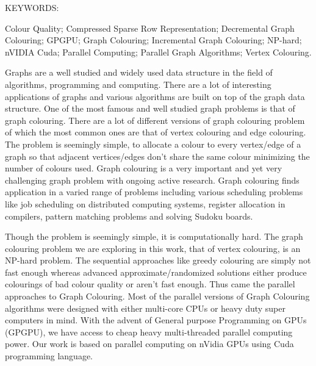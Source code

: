 \documentclass[MTech]{iitmdiss}
\begin{document}
\abstract
\noindent KEYWORDS: \hspace*{0.5em} \parbox[t]{4.4in}{Colour Quality; Compressed Sparse Row Representation; Decremental Graph Colouring; GPGPU; Graph Colouring; Incremental Graph Colouring; NP-hard; nVIDIA Cuda; Parallel Computing; Parallel Graph Algorithms; Vertex Colouring.}

\vspace*{24pt}

\noindent Graphs are a well studied and widely used data structure in the field of algorithms, programming and computing. There are a lot of interesting applications of graphs and various algorithms are built on top of the graph data structure. One of the most famous and well studied graph problems is that of graph colouring. There are a lot of different versions of graph colouring problem of which the most common ones are that of vertex colouring and edge colouring. The problem is seemingly simple, to allocate a colour to every vertex/edge of a graph so that adjacent vertices/edges don't share the same colour minimizing the number of colours used.  
Graph colouring is a very important and yet very challenging graph problem with ongoing active research. Graph colouring finds application in a varied range of problems including various scheduling problems like job scheduling on distributed computing systems, register allocation in compilers, pattern matching problems and solving Sudoku boards.

Though the problem is seemingly simple, it is computationally hard. The graph colouring problem we are exploring in this work, that of vertex colouring, is an NP-hard problem. The sequential approaches like greedy colouring are simply not fast enough whereas advanced approximate/randomized solutions either produce colourings of bad colour quality or aren't fast enough. Thus came the parallel approaches to Graph Colouring. Most of the parallel versions of Graph Colouring algorithms were designed with either multi-core CPUs or heavy duty super computers in mind. With the advent of General purpose Programming on GPUs (GPGPU), we have access to cheap heavy multi-threaded parallel computing power. Our work is based on parallel computing on nVidia GPUs using Cuda programming language.
\end{document}
